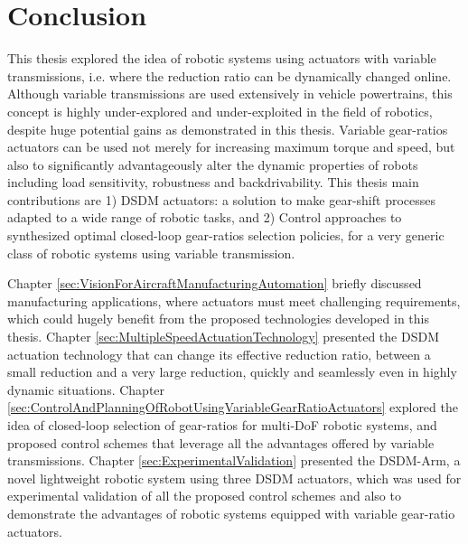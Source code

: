 \chapter{Conclusion}
\label{sec:Conclusion}








This thesis explored the idea of robotic systems using actuators with variable transmissions, i.e. where the reduction ratio can be dynamically changed online. Although variable transmissions are used extensively in vehicle powertrains, this concept is highly under-explored and under-exploited in the field of robotics, despite huge potential gains as demonstrated in this thesis. Variable gear-ratios actuators can be used not merely for increasing maximum torque and speed, but also to significantly advantageously alter the dynamic properties of robots including load sensitivity, robustness and backdrivability. This thesis main contributions are 1) DSDM actuators: a solution to make gear-shift processes adapted to a wide range of robotic tasks, and 2) Control approaches to synthesized optimal closed-loop gear-ratios selection policies, for a very generic class of robotic systems using variable transmission.

%
Chapter \ref{sec:VisionForAircraftManufacturingAutomation} briefly discussed manufacturing applications, where actuators must meet challenging requirements, which could hugely benefit from the proposed technologies developed in this thesis. 
%
Chapter \ref{sec:MultipleSpeedActuationTechnology} presented the DSDM actuation technology that can change its effective reduction ratio, between a small reduction and a very large reduction, quickly and seamlessly even in highly dynamic situations. 
%
Chapter \ref{sec:ControlAndPlanningOfRobotUsingVariableGearRatioActuators} explored the idea of closed-loop selection of gear-ratios for multi-DoF robotic systems, and proposed control schemes that leverage all the advantages offered by variable transmissions.
%
Chapter \ref{sec:ExperimentalValidation} presented the DSDM-Arm, a novel lightweight robotic system using three DSDM actuators, which was used for experimental validation of all the proposed control schemes and also to demonstrate the advantages of robotic systems equipped with variable gear-ratio actuators.

